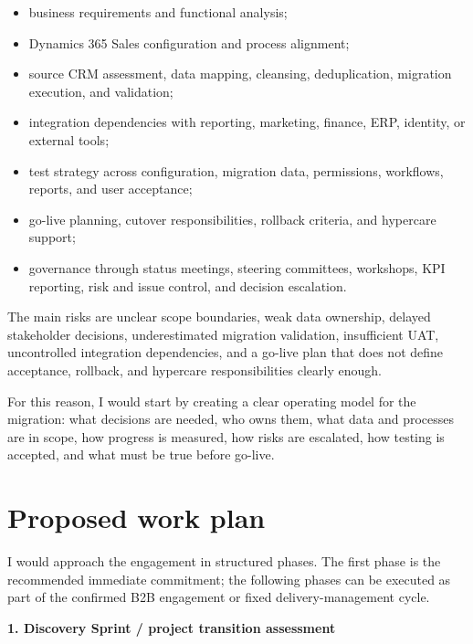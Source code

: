 \documentclass[11pt,a4paper]{article}
\begin{document}
\begin{itemize}
\item business requirements and functional analysis;
\item Dynamics 365 Sales configuration and process alignment;
\item source CRM assessment, data mapping, cleansing, deduplication, migration execution, and validation;
\item integration dependencies with reporting, marketing, finance, ERP, identity, or external tools;
\item test strategy across configuration, migration data, permissions, workflows, reports, and user acceptance;
\item go-live planning, cutover responsibilities, rollback criteria, and hypercare support;
\item governance through status meetings, steering committees, workshops, KPI reporting, risk and issue control, and decision escalation.
\end{itemize}

The main risks are unclear scope boundaries, weak data ownership, delayed stakeholder decisions, underestimated migration validation, insufficient UAT, uncontrolled integration dependencies, and a go-live plan that does not define acceptance, rollback, and hypercare responsibilities clearly enough.\par

For this reason, I would start by creating a clear operating model for the migration: what decisions are needed, who owns them, what data and processes are in scope, how progress is measured, how risks are escalated, how testing is accepted, and what must be true before go-live.\par

\section*{Proposed work plan}

I would approach the engagement in structured phases. The first phase is the recommended immediate commitment; the following phases can be executed as part of the confirmed B2B engagement or fixed delivery-management cycle.\par

\textbf{1. Discovery Sprint / project transition assessment}\par
\end{document}
